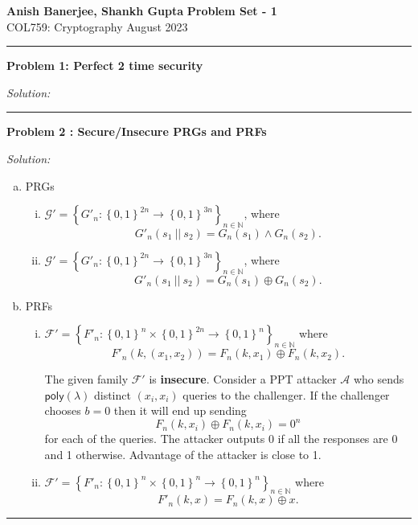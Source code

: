 \documentclass[a4paper, 11pt]{article}
\newcommand{\hr}{\noindent\rule{7in}{2.8pt}}
\newenvironment{solution}
    {\textit{Solution:}}
    {\hr}
\newcommand{\prob}[1]{\begin{mdframed}[backgroundcolor=gray!20] \textbf{Problem #1}\end{mdframed}}
\newcommand{\bit}{\left\{0, 1\right\}}
\newcommand{\poly}{\mathsf{poly}}
\newcommand{\N}{\mathbb{N}}
\newcommand{\calA}{\mathcal{A}}
\newcommand{\calF}{\mathcal{F}}
\newcommand{\calG}{\mathcal{G}}
\newcommand{\set}[1]{\left\{ #1 \right\}}
\begin{document}
\noindent
\large\textbf{Anish Banerjee, Shankh Gupta} \hfill \textbf{Problem Set - 1}   \\
\normalsize COL759: Cryptography \hfill August 2023\\
\hr


\prob{1: Perfect 2 time security}
\begin{solution}

\end{solution}


\prob{2 : Secure/Insecure PRGs and PRFs}
\begin{solution}
    \begin{enumerate}[(a)]
        \item PRGs
        \begin{enumerate}[i.]
            \item $\calG' = \set{G'_n : \bit^{2n} \to \bit^{3n}}_{n \in \N}$, where $$ G'_n(s_1 ~||~ s_2) = G_n(s_1) \wedge G_n(s_2).$$ 
            \item $\calG' = \set{G'_n : \bit^{2n} \to \bit^{3n}}_{n \in \N}$, where $$ G'_n(s_1 ~||~ s_2) = G_n(s_1) \oplus G_n(s_2).$$
        \end{enumerate}
        \item PRFs
        \begin{enumerate}[i.]
            \item $\calF' = \set{F'_n:\bit^{n} \times \bit^{2n} \to \bit^{n}}_{n\in \N}$ where $$F'_n(k, (x_1, x_2)) = F_n(k, x_1) \oplus F_n(k, x_2).$$  
            
            The given family $\calF'$ is \textbf{insecure}. Consider a PPT attacker $\calA$ who sends $\poly(\lambda)$ distinct $(x_i,x_i)$ queries to the  challenger. If the challenger chooses $b=0$ then it will end up sending $$F_n(k, x_i) \oplus F_n(k, x_i)=0^n$$ for each of the queries. The attacker outputs 0 if all the responses are 0 and 1 otherwise. Advantage of the attacker is close to 1.

            \item $\calF' = \set{F'_n:\bit^{n} \times \bit^{n} \to \bit^{n}}_{n\in \N}$ where $$F'_n(k, x) = F_n(k, x) \oplus x.$$
            

\end{enumerate}
\end{enumerate}
\end{solution}
\end{document}
